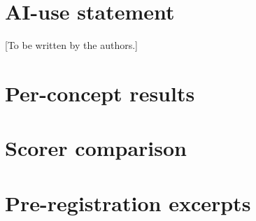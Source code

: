 \documentclass{article}
\begin{document}
\section*{AI-use statement}
[To be written by the authors.]




\appendix
\section{Per-concept results}
\section{Scorer comparison}
\section{Pre-registration excerpts}
\end{document}
